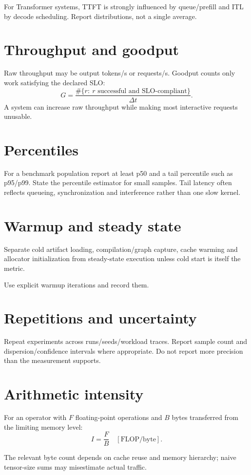 For Transformer systems, TTFT is strongly influenced by queue/prefill and ITL by decode scheduling. Report distributions, not a single average.

\section{Throughput and goodput}
Raw throughput may be output tokens/s or requests/s. Goodput counts only work satisfying the declared SLO:
\[
G=\frac{\#\{r:\ r\text{ successful and SLO-compliant}\}}{\Delta t}.
\]
A system can increase raw throughput while making most interactive requests unusable.

\section{Percentiles}
For a benchmark population report at least p50 and a tail percentile such as p95/p99. State the percentile estimator for small samples. Tail latency often reflects queueing, synchronization and interference rather than one slow kernel.

\section{Warmup and steady state}
Separate cold artifact loading, compilation/graph capture, cache warming and allocator initialization from steady-state execution unless cold start is itself the metric.

Use explicit warmup iterations and record them.

\section{Repetitions and uncertainty}
Repeat experiments across runs/seeds/workload traces. Report sample count and dispersion/confidence intervals where appropriate. Do not report more precision than the measurement supports.

\section{Arithmetic intensity}
For an operator with $F$ floating-point operations and $B$ bytes transferred from the limiting memory level:
\[
I=\frac{F}{B}\quad[\mathrm{FLOP/byte}].
\]

The relevant byte count depends on cache reuse and memory hierarchy; naive tensor-size sums may misestimate actual traffic.

